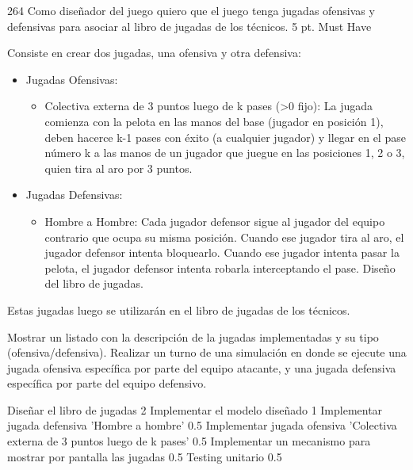\sprintstory
{264}
{Como diseñador del juego quiero que el juego tenga jugadas ofensivas y defensivas para asociar al libro de jugadas de los técnicos.}
{5 pt.}
{Must Have}
{Consiste en crear dos jugadas, una ofensiva y otra defensiva:
\begin{itemize}
  \item Jugadas Ofensivas:
  	\begin{itemize}
  		\item Colectiva externa de 3 puntos luego de k pases (\textgreater0 fijo): La jugada comienza con la pelota en las manos del base (jugador en posición 1), deben hacerce k-1 pases con éxito (a cualquier jugador) y llegar en el pase número k a las manos de un jugador que juegue en las posiciones 1, 2 o 3, quien tira al aro por 3 puntos.
  	\end{itemize}
  \item Jugadas Defensivas:
	\begin{itemize}
	  		\item Hombre a Hombre: Cada jugador defensor sigue al jugador del equipo contrario que ocupa su misma posición. Cuando ese jugador tira al aro, el jugador defensor intenta bloquearlo. Cuando ese jugador intenta pasar la pelota, el jugador defensor intenta robarla interceptando el pase. Diseño del libro de jugadas.
	\end{itemize}
\end{itemize}
Estas jugadas luego se utilizar\'an en el libro de jugadas de los técnicos.}
{Mostrar un listado con la descripción de la jugadas implementadas y su tipo (ofensiva/defensiva).
Realizar un turno de una simulación en donde se ejecute una jugada ofensiva específica por parte del equipo atacante, y una jugada
defensiva específica por parte del equipo defensivo.}

\begin{taskstable}
 \task
 {Diseñar el libro de jugadas}
 {2}
 \task
 {Implementar el modelo diseñado}
 {1}
 \task
 {Implementar jugada defensiva 'Hombre a hombre'}
 {0.5}
 \task
 {Implementar jugada ofensiva 'Colectiva externa de 3 puntos luego de k pases'}
 {0.5}
 \task
 {Implementar un mecanismo para mostrar por pantalla las jugadas}
 {0.5}
 \task
 {Testing unitario}
 {0.5}

\end{taskstable}

\vspace{1cm}


